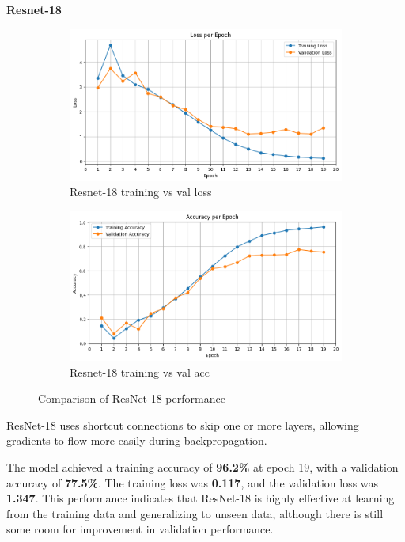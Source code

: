 \documentclass[12pt]{article}
\begin{document}
\textbf{Resnet-18}


\begin{figure}[ht]
    \centering
    \begin{subfigure}{0.45\linewidth}
        \centering
        \includegraphics[width=\linewidth]{t3_res_18_loss.png}
        \caption{Resnet-18 training vs val loss}
        \label{fig:t3_res_18_loss}
    \end{subfigure}
    \hfill
    \begin{subfigure}{0.45\linewidth}
        \centering
        \includegraphics[width=\linewidth]{t3_res_18_acc.png}
        \caption{Resnet-18 training vs val acc}
        \label{fig:t3_res_18_acc}
    \end{subfigure}
    \caption{Comparison of ResNet-18 performance}
    \label{fig:t3_res_18_performance}
\end{figure}

ResNet-18  uses shortcut connections to skip one or more layers, allowing gradients to flow more easily during backpropagation.

The model achieved a training accuracy of \textbf{96.2\%} at epoch 19, with a validation accuracy of \textbf{77.5\%}. The training loss was \textbf{0.117}, and the validation loss was \textbf{1.347}. This performance indicates that ResNet-18 is highly effective at learning from the training data and generalizing to unseen data, although there is still some room for improvement in validation performance.
\end{document}
